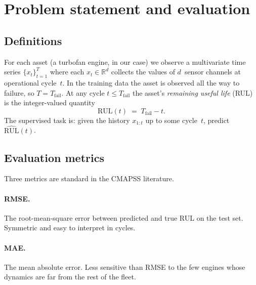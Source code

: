 \documentclass[11pt,letterpaper]{article}
\begin{document}
\section{Problem statement and evaluation}\label{sec:problem}
\subsection{Definitions}
For each asset (a turbofan engine, in our case) we observe a
multivariate time series
$\{ x_t \}_{t=1}^{T}$ where each
$x_t \in \mathbb{R}^{d}$ collects the values of $d$~sensor channels at
operational cycle~$t$. In the training data the asset is observed all
the way to failure, so $T = T_{\text{fail}}$. At any cycle
$t \le T_{\text{fail}}$ the asset's \emph{remaining useful life} (RUL)
is the integer-valued quantity
\begin{equation}
\mathrm{RUL}(t) \;=\; T_{\text{fail}} - t.
\label{eq:rul}
\end{equation}
The supervised task is: given the history
$x_{1:t}$ up to some cycle~$t$, predict $\widehat{\mathrm{RUL}}(t)$.

\subsection{Evaluation metrics}\label{sec:metrics}
Three metrics are standard in the CMAPSS literature.

\paragraph{RMSE.} The root-mean-square error between predicted and
true RUL on the test set. Symmetric and easy to interpret in cycles.

\paragraph{MAE.} The mean absolute error. Less sensitive than RMSE to
the few engines whose dynamics are far from the rest of the fleet.
\end{document}
